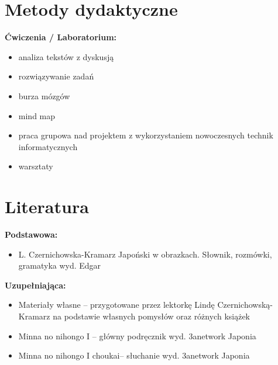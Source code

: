 \documentclass[12pt, a4paper]{article}
\begin{document}
\section{Metody dydaktyczne}

\textbf{Ćwiczenia / Laboratorium:}
\begin{itemize}
  \item analiza tekstów z dyskusją
  \item rozwiązywanie zadań
  \item burza mózgów
  \item mind map
  \item praca grupowa nad projektem z wykorzystaniem nowoczesnych technik informatycznych
  \item warsztaty
\end{itemize}
\vspace{4pt}


\section{Literatura}

\textbf{Podstawowa:}
\begin{itemize}
  \item L. Czernichowska-Kramarz Japoński w obrazkach. Słownik, rozmówki, gramatyka wyd. Edgar
\end{itemize}

\textbf{Uzupełniająca:}
\begin{itemize}
  \item Materiały własne – przygotowane przez lektorkę Lindę Czernichowską-Kramarz na podstawie własnych pomysłów oraz różnych książek
  \item Minna no nihongo I – główny podręcznik  wyd. 3anetwork Japonia
  \item Minna no nihongo I choukai– słuchanie  wyd. 3anetwork Japonia
\end{itemize}
\end{document}
